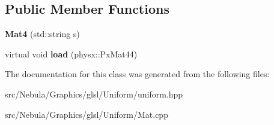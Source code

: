 \subsection*{\-Public \-Member \-Functions}
\begin{DoxyCompactItemize}
\item 
\hypertarget{classNeb_1_1glsl_1_1Uniform_1_1Scalar_1_1Mat4_ac57a935305d8c22176790fde979b5414}{{\bfseries \-Mat4} (std\-::string s)}\label{classNeb_1_1glsl_1_1Uniform_1_1Scalar_1_1Mat4_ac57a935305d8c22176790fde979b5414}

\item 
\hypertarget{classNeb_1_1glsl_1_1Uniform_1_1Scalar_1_1Mat4_ad3cf1854c3520a78d5650352574a51d2}{virtual void {\bfseries load} (physx\-::\-Px\-Mat44)}\label{classNeb_1_1glsl_1_1Uniform_1_1Scalar_1_1Mat4_ad3cf1854c3520a78d5650352574a51d2}

\end{DoxyCompactItemize}


\-The documentation for this class was generated from the following files\-:\begin{DoxyCompactItemize}
\item 
src/\-Nebula/\-Graphics/glsl/\-Uniform/uniform.\-hpp\item 
src/\-Nebula/\-Graphics/glsl/\-Uniform/\-Mat.\-cpp\end{DoxyCompactItemize}
